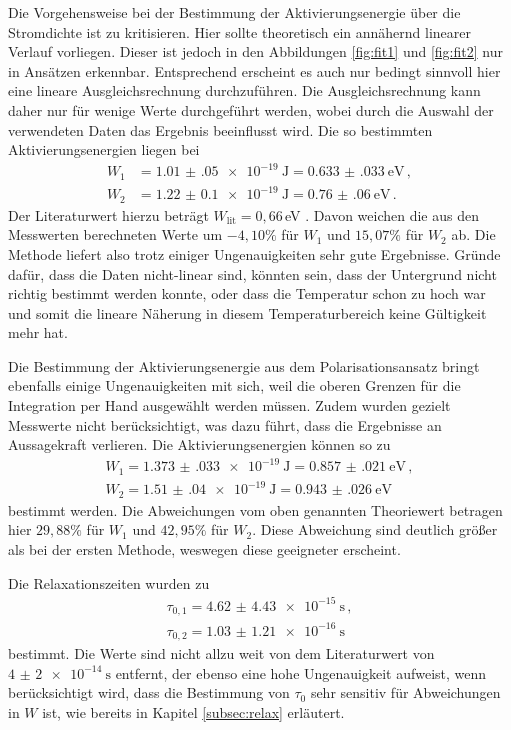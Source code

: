 Die Vorgehensweise bei der Bestimmung der Aktivierungsenergie über die Stromdichte ist zu kritisieren.
Hier sollte theoretisch ein annähernd linearer Verlauf vorliegen. Dieser ist jedoch
in den Abbildungen \ref{fig:fit1} und \ref{fig:fit2} nur in Ansätzen erkennbar.
Entsprechend erscheint es auch nur bedingt sinnvoll hier eine lineare Ausgleichsrechnung
durchzuführen. Die Ausgleichsrechnung kann daher nur für wenige Werte durchgeführt
werden, wobei durch die Auswahl der verwendeten Daten das Ergebnis beeinflusst
wird. Die so bestimmten Aktivierungsenergien liegen bei
\begin{align*}
 W_1&=\SI{1.01(05)e-19}{\joule}= \SI{0.633(033)}{\eV}  \,, \\
 W_2&=\SI{1.22(010)e-19}{\joule}=\SI{0.76(06)}{\eV} \,.
\end{align*}
Der Literaturwert hierzu beträgt $W_{\text{lit}}=0{,}66\,$eV \cite{lit}. Davon weichen
die aus den Messwerten berechneten Werte um $-4{,}10\%$ für $W_1$ und $15{,}07\%$ für
$W_2$ ab.
Die Methode liefert also trotz einiger
Ungenauigkeiten sehr gute Ergebnisse.
Gründe dafür, dass die Daten nicht-linear sind, könnten sein, dass der Untergrund
nicht richtig bestimmt werden konnte, oder dass die Temperatur schon zu hoch war und somit
die lineare Näherung in diesem Temperaturbereich keine Gültigkeit mehr hat.

Die Bestimmung der Aktivierungsenergie aus dem Polarisationsansatz bringt ebenfalls
einige Ungenauigkeiten mit sich, weil die oberen Grenzen für die Integration per Hand
ausgewählt werden müssen. Zudem wurden gezielt Messwerte nicht berücksichtigt, was
dazu führt, dass die Ergebnisse an Aussagekraft verlieren. Die Aktivierungsenergien
können so zu
\begin{align*}
	W_1=\SI{1.373(033)e-19}{\joule}=\SI{0.857(021)}{\eV} \,, \\
	W_2=\SI{1.51(04)e-19}{\joule}=\SI{0.943(026)}{\eV} \,
\end{align*}
bestimmt werden.
Die Abweichungen vom oben genannten Theoriewert betragen hier
$29{,}88\%$ für $W_1$ und $42{,}95\%$ für $W_2$. Diese Abweichung sind deutlich größer als bei der ersten Methode, weswegen diese geeigneter erscheint.

Die Relaxationszeiten wurden zu
\begin{align*}
	\tau_{0,1}=\SI{4.62(443)e-15}{\second} \,, \\
	\tau_{0,2}=\SI{1.03(121)e-16}{\second} \,
\end{align*}
bestimmt.
Die Werte sind nicht allzu weit von dem Literaturwert von $\SI{4(2)e-14}{\second}$ \cite{lit} entfernt, der ebenso eine hohe Ungenauigkeit aufweist, wenn berücksichtigt wird, dass die Bestimmung von $\tau_0$ sehr sensitiv für Abweichungen in $W$ ist, wie bereits in Kapitel \ref{subsec:relax} erläutert.

